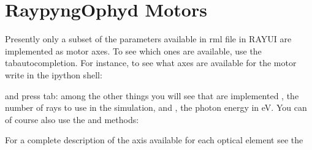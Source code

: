 \documentclass[letterpaper,10pt,english]{sphinxmanual}
\begin{document}
\section{RaypyngOphyd \sphinxhyphen{} Motors}
\label{\detokenize{tutorial:raypyngophyd-motors}}
\sphinxAtStartPar
Presently only a subset of the parameters available in rml file in RAY\sphinxhyphen{}UI are implemented as motor axes. To see which ones are available,
use the tab\sphinxhyphen{}autocompletion. For instance, to see what axes are available for the motor  write in the ipython shell:

\begin{sphinxVerbatim}[commandchars=\\\{\}]
\end{sphinxVerbatim}

\sphinxAtStartPar
and press tab: among the other things you will see that are implemented , the number of rays to use in the simulation,
and , the photon energy in eV. You can of course also use the  and  methods:

\begin{sphinxVerbatim}[commandchars=\\\{\}]
 \PYG{p}{[}\PYG{p}{]} 
\PYG{p}{[}\PYG{p}{]} 

 \PYG{p}{[}\PYG{p}{]} 
\PYG{p}{[}\PYG{p}{]}   

 \PYG{p}{[}\PYG{p}{]} 
\PYG{p}{[}\PYG{p}{]} 
\end{sphinxVerbatim}

\sphinxAtStartPar
For a complete description of the axis available for each optical element see the 
\end{document}
